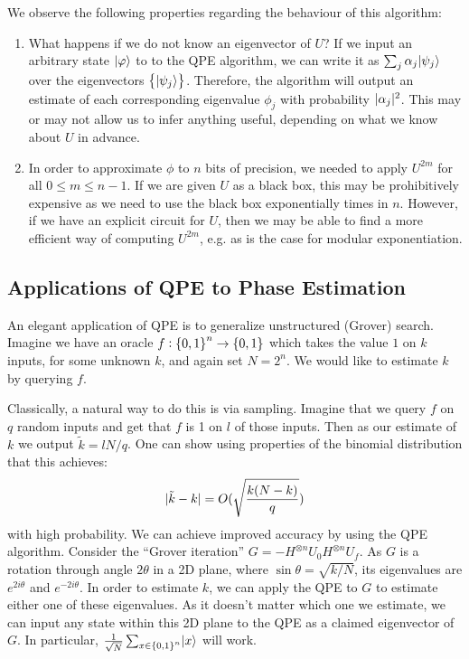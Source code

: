 We observe the following properties regarding the behaviour of this algorithm:
\begin{enumerate}
    \item What happens if we do not know an eigenvector of $U$? If we input an arbitrary state $\lvert \varphi \rangle$ to to the QPE algorithm, we can write it as $\sum_j \alpha_j \lvert \psi_j \rangle$ over the eigenvectors $\set{\lvert \psi_j \rangle}$. Therefore, the algorithm will output an estimate of each corresponding eigenvalue $\phi_j$ with probability $\lvert \alpha_j \rvert^2$. This may or may not allow us to infer anything useful, depending on what we know about $U$ in advance.
    \item In order to approximate $\phi$ to $n$ bits of precision, we needed to apply $U^{2m}$ for all $0 \leq m \leq n -1$. If we are given $U$ as a black box, this may be prohibitively expensive as we need to use the black box exponentially times in $n$. However, if we have an explicit circuit for $U$, then we may be able to find a more efficient way of computing $U^{2m}$, e.g. as is the case for modular exponentiation.
\end{enumerate}
\subsection*{Applications of QPE to Phase Estimation}
An elegant application of QPE is to generalize unstructured (Grover) search. Imagine we have an oracle $f: \set{0, 1}^n \to \set{0, 1}$ which takes the value $1$ on $k$ inputs, for some unknown $k$, and again set $N = 2^n$. We would like to estimate $k$ by querying $f$.

Classically, a natural way to do this is via sampling. Imagine that we query $f$ on $q$ random inputs and get that $f$ is 1 on $l$ of those inputs. Then as our estimate of $k$ we output $\tilde{k} = lN/q$. One can show using properties of the binomial distribution that this achieves:
\begin{equation}
    \lvert \tilde{k} - k \rvert = O(\sqrt{\frac{k(N-k)}{q}})
\end{equation}
with high probability. We can achieve improved accuracy by using the QPE algorithm. Consider the ``Grover iteration'' $G = -H^{\otimes n}U_0 H^{\otimes n}U_f$. As $G$ is a rotation through angle $2\theta$ in a 2D plane, where $\sin\theta = \sqrt{k/N}$, its eigenvalues are $e^{2i\theta}$ and $e^{-2i\theta}$. In order to estimate $k$, we can apply the QPE to $G$ to estimate either one of these eigenvalues. As it doesn't matter which one we estimate, we can input any state within this 2D plane to the QPE as a claimed eigenvector of $G$. In particular, $\frac{1}{\sqrt{N}}\sum_{x \in \set{0, 1}^n}\lvert x \rangle$ will work.

